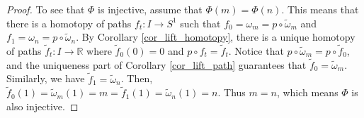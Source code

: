 \documentclass{report}
\theoremstyle{definition}
\theoremstyle{remark}
\newcommand{\R}{\mathbb{R}}
\begin{document}
\begin{proof}
    To see that $\Phi$ is injective, assume that $\Phi(m) = \Phi(n)$. This means that there is a homotopy of paths $f_t : I \to S^1$ such that $f_0 = \omega_m = p \circ \tilde{\omega}_m$ and $f_1 = \omega_n = p \circ \tilde{\omega}_n$. By Corollary \ref{cor_lift_homotopy}, there is a unique homotopy of paths $\tilde{f}_t : I \to  \R$ where $\tilde{f}_0(0) = 0$ and $p \circ f_t = \tilde{f}_t$. Notice that $p \circ \tilde{\omega}_m = p \circ \tilde{f}_0$, and the uniqueness part of Corollary \ref{cor_lift_path} guarantees that $\tilde{f}_0 = \tilde{\omega}_m$. Similarly, we have $\tilde{f}_1 = \tilde{\omega}_n$. Then, $\tilde{f}_0(1) = \tilde{\omega}_m(1) = m = \tilde{f}_1(1) = \tilde{\omega}_n(1) = n$. Thus $m = n$, which means $\Phi$ is also injective.
\end{proof}
\end{document}
